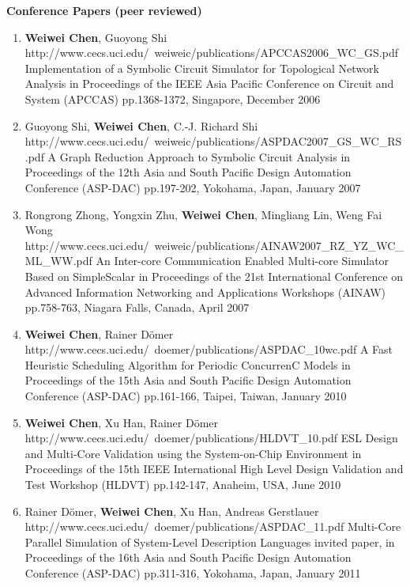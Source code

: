 \vspace{5mm}
{\textbf{\large Conference Papers (peer reviewed)}}
\vspace{-2mm}
\begin{enumerate}

\item
	\mypubhl
	{\textbf{Weiwei Chen}, Guoyong Shi}
	{http://www.cecs.uci.edu/~weiweic/publications/APCCAS2006_WC_GS.pdf}
	{Implementation of a Symbolic Circuit Simulator for Topological Network Analysis}
	{in Proceedings of }
	{the IEEE Asia Pacific Conference on Circuit and System (APCCAS)}
	{pp.1368-1372, Singapore, December 2006}
	
\item
	\mypubhl
	{Guoyong Shi, \textbf{Weiwei Chen}, C.-J. Richard Shi}
	{http://www.cecs.uci.edu/~weiweic/publications/ASPDAC2007_GS_WC_RS.pdf}
	{A Graph Reduction Approach to Symbolic Circuit Analysis}
	{in Proceedings of }
	{the 12th Asia and South Pacific Design Automation Conference (ASP-DAC)} 
	{pp.197-202, Yokohama, Japan, January 2007}

\item
	\mypubhl
	{Rongrong Zhong, Yongxin Zhu, \textbf{Weiwei Chen}, Mingliang Lin, Weng Fai Wong}
	{http://www.cecs.uci.edu/~weiweic/publications/AINAW2007_RZ_YZ_WC_ML_WW.pdf}
	{An Inter-core Communication Enabled Multi-core Simulator Based on SimpleScalar} 
	{in Proceedings of }
	{the 21st International Conference on Advanced Information Networking and Applications Workshops (AINAW)}
	{pp.758-763, Niagara Falls, Canada, April 2007}
	
	
\item
	\mypubhl
	{\textbf{Weiwei Chen}, Rainer D\"{o}mer}
	{http://www.cecs.uci.edu/~doemer/publications/ASPDAC_10wc.pdf} 
	{A Fast Heuristic Scheduling Algorithm for Periodic ConcurrenC Models}
	{in Proceedings of }
	{the 15th Asia and South Pacific Design Automation Conference (ASP-DAC)}
	{pp.161-166, Taipei, Taiwan, January 2010}
	
\item
	\mypubhl
	{\textbf{Weiwei Chen}, Xu Han, Rainer D\"{o}mer}
	{http://www.cecs.uci.edu/~doemer/publications/HLDVT_10.pdf}
	{ESL Design and Multi-Core Validation using the System-on-Chip Environment}
	{in Proceedings of }
	{the 15th IEEE International High Level Design Validation and Test Workshop (HLDVT)}
	{pp.142-147, Anaheim, USA, June 2010}
	
	
\item
	\mypubhl
	{Rainer D\"{o}mer, \textbf{Weiwei Chen}, Xu Han, Andreas Gerstlauer}
	{http://www.cecs.uci.edu/~doemer/publications/ASPDAC_11.pdf}
	{Multi-Core Parallel Simulation of System-Level Description Languages}
	{invited paper, in Proceedings of }
	{the 16th Asia and South Pacific Design Automation Conference (ASP-DAC)}
	{pp.311-316, Yokohama, Japan, January 2011}
	

\end{enumerate}
